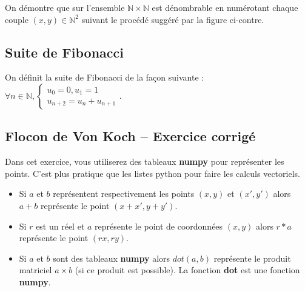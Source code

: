 On démontre que sur l'ensemble $\mathbb{N}\times \mathbb{N}$ est dénombrable en numérotant chaque couple $(x,y)\in\mathbb{N}^2$ suivant le procédé suggéré par la figure ci-contre.





\subsection*{Suite de Fibonacci}

On définit la suite de Fibonacci de la façon suivante : $
\forall n\in \mathbb{N}, \left\{ \begin{array}{l}
u_0 = 0, u_1 = 1 \\
u_{n+2} = u_{n} + u_{n+1}
\end{array}\right.
$.







\subsection*{Flocon de Von Koch -- Exercice corrigé}

Dans cet exercice, vous utiliserez des tableaux \textbf{numpy} pour représenter les points. C'est plus pratique que les 
listes python pour faire les calculs vectoriels.

\begin{itemize}
\item Si $a$ et $b$ représentent respectivement les points $(x,y)$ et $(x',y')$ alors $a+b$ représente le point 
$(x+x',y+y')$.
\item Si $r$ est un réel et $a$ représente le point de coordonnées $(x,y)$ alors $r*a$ représente le point $(rx,ry)$.
\item Si $a$ et $b$ sont des tableaux \textbf{numpy} alors $dot(a,b)$ représente le produit matriciel $a\times b$ (si ce 
produit est possible). La fonction \textbf{dot} est une fonction \textbf{numpy}.
\end{itemize}

